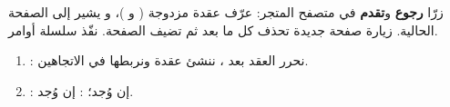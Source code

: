 \begin{statement}
زرّا \textbf{رجوع} و\textbf{تقدم} في متصفح المتجر: عرّف عقدة مزدوجة ( و )، و يشير إلى الصفحة الحالية. زيارة صفحة جديدة تحذف كل ما بعد  ثم تضيف الصفحة. نفّذ سلسلة أوامر.
\end{statement}
\begin{stepsbox}\begin{enumerate}
\item {}: نحرر العقد بعد ، ننشئ عقدة ونربطها في الاتجاهين.
\item {}:  إن وُجد؛ :  إن وُجد.
\end{enumerate}\end{stepsbox}
